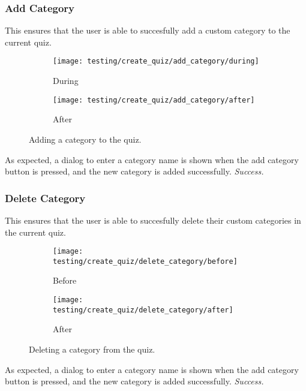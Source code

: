 \subsubsection{Add Category} %
\label{ssub:add_category}
This ensures that the user is able to succesfully add a custom category to the current quiz.
\begin{figure}[!htbp]
\centering
\begin{subfigure}{0.5\textwidth}
  \centering
  \texttt{[image: testing/create\_quiz/add\_category/during]}
  \caption{During}
  \label{fig:sub1}
\end{subfigure}%
\begin{subfigure}{0.5\textwidth}
  \centering
  \texttt{[image: testing/create\_quiz/add\_category/after]}
  \caption{After}
  \label{fig:sub2}
\end{subfigure}
\caption{Adding a category to the quiz.}
\label{fig:test}
\end{figure}
As expected, a dialog to enter a category name is shown when the add category button is pressed, and the new category is added successfully. \textit{Success.}


\subsubsection{Delete Category} %
\label{ssub:add_category}
This ensures that the user is able to succesfully delete their custom categories in the current quiz.
\begin{figure}[!htbp]
\centering
\begin{subfigure}{0.5\textwidth}
  \centering
  \texttt{[image: testing/create\_quiz/delete\_category/before]}
  \caption{Before}
  \label{fig:sub1}
\end{subfigure}%
\begin{subfigure}{0.5\textwidth}
  \centering
  \texttt{[image: testing/create\_quiz/delete\_category/after]}
  \caption{After}
  \label{fig:sub2}
\end{subfigure}
\caption{Deleting a category from the quiz.}
\label{fig:test}
\end{figure}
As expected, a dialog to enter a category name is shown when the add category button is pressed, and the new category is added successfully. \textit{Success.}


